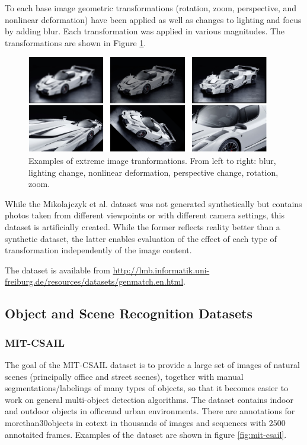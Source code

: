 To each base image geometric transformations (rotation, zoom, perspective, and nonlinear
deformation) have been applied as well as changes to lighting and focus by adding blur. Each transformation was
applied in various magnitudes. The transformations are shown in Figure \ref{fig:fischerDBtrans}. 

\begin{figure}[H]
\begin{center}
\includegraphics[width=0.95\textwidth]{fig/MatchDBFreiburgTrans}
\end{center}
\caption{Examples of extreme image tranformations. From left to
right: blur, lighting change, nonlinear deformation, perspective change, rotation, zoom.}
\label{fig:fischerDBtrans}
\end{figure}

While the Mikolajczyk et al. dataset  \cite{Mikolajczyk:2005} was not generated synthetically but contains photos taken
from different viewpoints or with different camera settings, this dataset is artificially created. While the former reflects reality better than a
synthetic dataset, the latter enables evaluation of the effect of each type of transformation independently of the image content. 

The dataset is available from \url{http://lmb.informatik.uni-freiburg.de/resources/datasets/genmatch.en.html}.

\subsection{Object and Scene Recognition Datasets}
\label{subsec:obj_scene_db}

\subsubsection{MIT-CSAIL}
The goal of the MIT-CSAIL dataset \cite{mit-csail_db} is to provide a large set of images of natural scenes (principally office and street scenes), together with manual segmentations/labelings of many types of objects, so that it becomes easier to work on general multi-object detection algorithms. The dataset contains indoor and outdoor objects in officeand urban environments. There are annotations for morethan30objects in cotext in thousands of images and sequences with 2500 annotaited frames. Examples of the dataset are shown in figure \ref{fig:mit-csail}.

